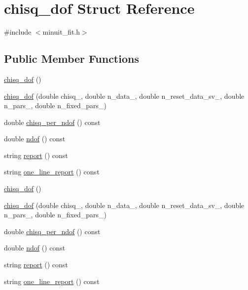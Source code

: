 \hypertarget{structchisq__dof}{}\section{chisq\+\_\+dof Struct Reference}
\label{structchisq__dof}


{\ttfamily \#include $<$minuit\+\_\+fit.\+h$>$}

\subsection*{Public Member Functions}
\begin{DoxyCompactItemize}
\item 
\mbox{\hyperlink{structchisq__dof_a19eaad60dbf9e94aacb33408a49d9d68}{chisq\+\_\+dof}} ()
\item 
\mbox{\hyperlink{structchisq__dof_ad78b147829b0f449ac59964a25953c67}{chisq\+\_\+dof}} (double chisq\+\_\+, double n\+\_\+data\+\_\+, double n\+\_\+reset\+\_\+data\+\_\+sv\+\_\+, double n\+\_\+pars\+\_\+, double n\+\_\+fixed\+\_\+pars\+\_\+)
\item 
double \mbox{\hyperlink{structchisq__dof_a07ed162cd41ce4a036f5e527c52ab66d}{chisq\+\_\+per\+\_\+ndof}} () const
\item 
double \mbox{\hyperlink{structchisq__dof_a14e009144be8062101c59798a6239f5b}{ndof}} () const
\item 
string \mbox{\hyperlink{structchisq__dof_afa6ae05c4bc5fb54e635447c3358b09d}{report}} () const
\item 
string \mbox{\hyperlink{structchisq__dof_af82b1ce8f285c664b9c9529df2dc527a}{one\+\_\+line\+\_\+report}} () const
\item 
\mbox{\hyperlink{structchisq__dof_a19eaad60dbf9e94aacb33408a49d9d68}{chisq\+\_\+dof}} ()
\item 
\mbox{\hyperlink{structchisq__dof_ad78b147829b0f449ac59964a25953c67}{chisq\+\_\+dof}} (double chisq\+\_\+, double n\+\_\+data\+\_\+, double n\+\_\+reset\+\_\+data\+\_\+sv\+\_\+, double n\+\_\+pars\+\_\+, double n\+\_\+fixed\+\_\+pars\+\_\+)
\item 
double \mbox{\hyperlink{structchisq__dof_a07ed162cd41ce4a036f5e527c52ab66d}{chisq\+\_\+per\+\_\+ndof}} () const
\item 
double \mbox{\hyperlink{structchisq__dof_a14e009144be8062101c59798a6239f5b}{ndof}} () const
\item 
string \mbox{\hyperlink{structchisq__dof_afa6ae05c4bc5fb54e635447c3358b09d}{report}} () const
\item 
string \mbox{\hyperlink{structchisq__dof_af82b1ce8f285c664b9c9529df2dc527a}{one\+\_\+line\+\_\+report}} () const
\end{DoxyCompactItemize}
